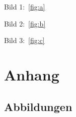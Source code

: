 \documentclass{scrreprt}
\begin{document}
Bild 1:~\ref{fig:a}

Bild 2:~\ref{fig:b}

Bild 3:~\ref{fig:c}

\appendix
\chapter{Anhang}
\section{Abbildungen}

\begin{measuredfigure}[h]
\caption[Verzeichnis]{Bildunterschrift}
\label{fig:a}		
\end{measuredfigure}

\begin{measuredfigure}[h]
\caption[Verzeichnis]{Bildunterschrift}
\label{fig:b}		
\end{measuredfigure}

\begin{measuredfigure}[h]
\caption[Verzeichnis]{Bildunterschrift}
\label{fig:c}		
\end{measuredfigure}
\end{document}
